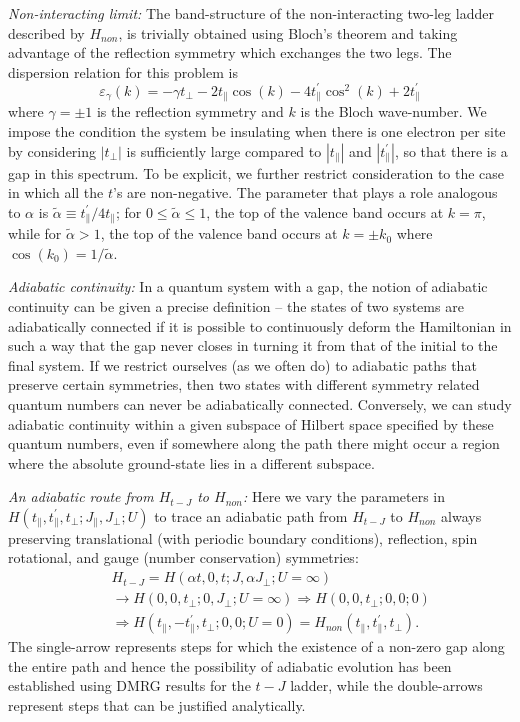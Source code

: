 \documentclass[aps,prb,twocolumn]{revtex4}
\def\be{\begin{equation}}       \def\ee{\end{equation}}
\def\bea{\begin{eqnarray}}      \def\eea{\end{eqnarray}}
\begin{document}
{\it Non-interacting limit:}
The band-structure of the non-interacting two-leg ladder described  by $H_{non}$, is trivially obtained using Bloch's theorem and taking advantage of the reflection symmetry which exchanges the two legs.  The dispersion relation for this problem is
\be
\varepsilon_\gamma(k) = -\gamma t_\perp -2t_\parallel\cos(k) - 4t_\parallel^\prime \cos^2(k) +2t_\parallel^\prime
\ee
 where $\gamma=\pm 1$ is the reflection symmetry and $k$ is the Bloch wave-number. We impose the condition the system be insulating when there is one electron per site by considering  $|t_\perp|$ is sufficiently large compared to $|t_\parallel |$ and $|t_\parallel^\prime |$, so that there is a gap in this spectrum.  To be explicit, we further restrict consideration to the case in which all the $t$'s are non-negative. The parameter that plays a role analogous to $\alpha$ is $\tilde \alpha \equiv t_\parallel^\prime/4t_\parallel$;  for $0\leq \tilde \alpha \leq 1$, the top of the valence band occurs at $k=\pi$, while for $\tilde \alpha > 1$, the top of the valence band occurs at $k=\pm k_0$ where $\cos(k_0) = 1/\tilde \alpha$.   


{\it Adiabatic continuity:}  In a quantum system with a gap, the notion of adiabatic continuity can be given a precise definition -- the states of two systems are adiabatically connected if it is possible to continuously deform the Hamiltonian in such a way that the gap never closes in turning it from that of the initial to the final system.
  If we restrict ourselves (as we often do) to adiabatic paths that preserve
certain symmetries, then two states with different symmetry related quantum
numbers can never be adiabatically connected.  Conversely, we can study
adiabatic continuity within a given subspace of Hilbert space specified by
these quantum numbers, even if somewhere along the path there might occur a
region where the absolute ground-state lies in a different subspace.\cite{thermo}

{\it An adiabatic route from $H_{t-J}$ to $H_{non}$:}  Here we vary the parameters in $H(t_\parallel,t_\parallel^\prime,t_\perp;J_\parallel,J_\perp;U)$ to trace an adiabatic path from $H_{t-J}$ to $H_{non}$ always preserving translational (with  periodic boundary conditions), reflection, spin rotational, and gauge  (number conservation) symmetries:
\bea
\label{adiabatic}
&&H_{t-J} = H(\alpha t,0,t;J,\alpha J_\perp;U=\infty)  \\
&&\longrightarrow  H(0,0,t_\perp;0,J_\perp;U=\infty) \Longrightarrow H(0,0,t_\perp;0,0;0) \nonumber\\
&& \Longrightarrow H(t_\parallel,-t_\parallel^\prime,t_\perp;0,0;U=0) = H_{non}(t_\parallel,t_\parallel^\prime,t_\perp).
\nonumber
\eea
The single-arrow represents steps  for which the existence of a non-zero gap along the entire path and hence the possibility of adiabatic evolution has been established using DMRG results for the $t-J$ ladder, while the double-arrows represent steps that can be justified analytically.
\end{document}
